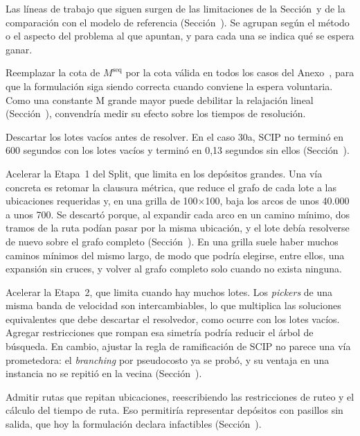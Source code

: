 Las líneas de trabajo que siguen surgen de las limitaciones de la
Sección~ y de la comparación con el modelo de referencia
(Sección~). Se agrupan según el método o el aspecto
del problema al que apuntan, y para cada una se indica qué se espera ganar.

\startsubsection[title={Modelos lineales}]

\startitemize
	\item Reemplazar la cota de $M^{\text{seq}}$ por la cota válida en todos los
	casos del Anexo~, para que la formulación siga siendo
	correcta cuando conviene la espera voluntaria. Como una constante M grande
	mayor puede debilitar la relajación lineal (Sección~),
	convendría medir su efecto sobre los tiempos de resolución.
	\item Descartar los lotes vacíos antes de resolver. En el caso 30a, SCIP no
	terminó en 600 segundos con los lotes vacíos y terminó en 0,13 segundos sin
	ellos (Sección~).
	\item Acelerar la Etapa~1 del Split, que limita en los depósitos grandes.
	Una vía concreta es retomar la clausura métrica, que reduce el grafo de
	cada lote a las ubicaciones requeridas y, en una grilla de 100×100, baja
	los arcos de unos 40.000 a unos 700. Se descartó porque, al expandir cada
	arco en un camino mínimo, dos tramos de la ruta podían pasar por la misma
	ubicación, y el lote debía resolverse de nuevo sobre el grafo completo
	(Sección~). En una grilla suele haber muchos
	caminos mínimos del mismo largo, de modo que podría elegirse, entre ellos,
	una expansión sin cruces, y volver al grafo completo solo cuando no exista
	ninguna.
	\item Acelerar la Etapa~2, que limita cuando hay muchos lotes. Los
	{\em pickers} de una misma banda de velocidad son intercambiables, lo que
	multiplica las soluciones equivalentes que debe descartar el resolvedor,
	como ocurre con los lotes vacíos. Agregar restricciones que rompan esa
	simetría podría reducir el árbol de búsqueda. En cambio, ajustar la regla
	de ramificación de SCIP no parece una vía prometedora: el {\em branching}
	por pseudocosto ya se probó, y su ventaja en una instancia no se repitió
	en la vecina (Sección~).
	\item Admitir rutas que repitan ubicaciones, reescribiendo las restricciones
	de ruteo y el cálculo del tiempo de ruta. Eso permitiría representar
	depósitos con pasillos sin salida, que hoy la formulación declara
	infactibles (Sección~).
\stopitemize

